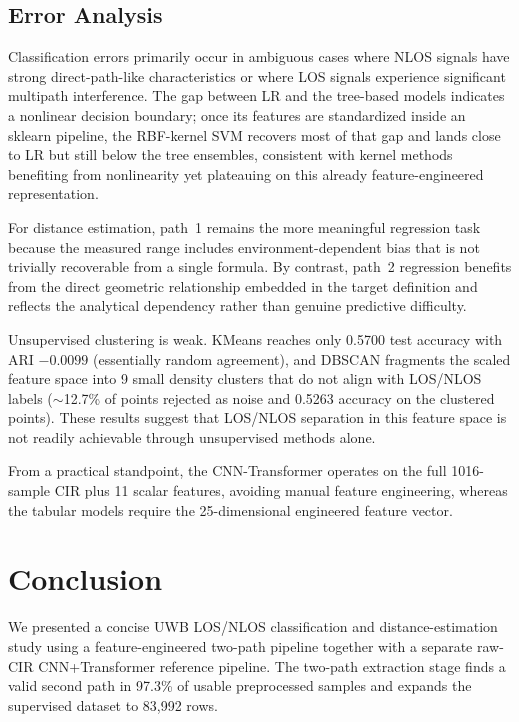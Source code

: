 \documentclass[conference]{IEEEtran}
\begin{document}
\subsection{Error Analysis}

Classification errors primarily occur in ambiguous cases where NLOS signals have strong direct-path-like characteristics or where LOS signals experience significant multipath interference. The gap between LR and the tree-based models indicates a nonlinear decision boundary; once its features are standardized inside an sklearn pipeline, the RBF-kernel SVM recovers most of that gap and lands close to LR but still below the tree ensembles, consistent with kernel methods benefiting from nonlinearity yet plateauing on this already feature-engineered representation.

For distance estimation, path~1 remains the more meaningful regression task because the measured range includes environment-dependent bias that is not trivially recoverable from a single formula. By contrast, path~2 regression benefits from the direct geometric relationship embedded in the target definition and reflects the analytical dependency rather than genuine predictive difficulty.

Unsupervised clustering is weak. KMeans reaches only 0.5700 test accuracy with ARI $-0.0099$ (essentially random agreement), and DBSCAN fragments the scaled feature space into 9 small density clusters that do not align with LOS/NLOS labels ($\sim$12.7\% of points rejected as noise and 0.5263 accuracy on the clustered points). These results suggest that LOS/NLOS separation in this feature space is not readily achievable through unsupervised methods alone.

From a practical standpoint, the CNN-Transformer operates on the full 1016-sample CIR plus 11 scalar features, avoiding manual feature engineering, whereas the tabular models require the 25-dimensional engineered feature vector.

\section{Conclusion}

We presented a concise UWB LOS/NLOS classification and distance-estimation study using a feature-engineered two-path pipeline together with a separate raw-CIR CNN+Transformer reference pipeline. The two-path extraction stage finds a valid second path in 97.3\% of usable preprocessed samples and expands the supervised dataset to 83,992 rows.
\end{document}
